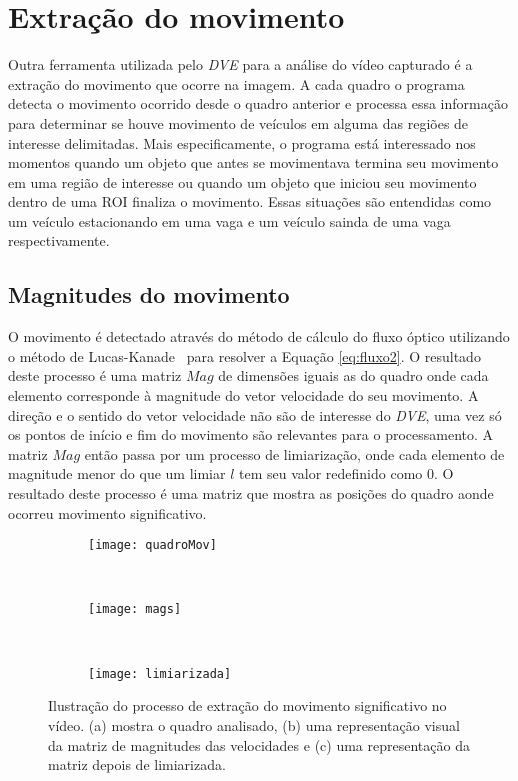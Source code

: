 \section{Extração do movimento}

Outra ferramenta utilizada pelo \textit{DVE} para a análise do vídeo capturado é a extração do movimento que ocorre na imagem. A cada quadro o programa detecta o movimento ocorrido desde o quadro anterior e processa essa informação para determinar se houve movimento de veículos em alguma das regiões de interesse delimitadas. Mais especificamente, o programa está interessado nos momentos quando um objeto que antes se movimentava termina seu movimento em uma região de interesse ou quando um objeto que iniciou seu movimento dentro de uma ROI finaliza o movimento. Essas situações são entendidas como um veículo estacionando em uma vaga e um veículo sainda de uma vaga respectivamente.

\subsection{Magnitudes do movimento}

O movimento é detectado através do método de cálculo do fluxo óptico utilizando o método de Lucas-Kanade~\cite{bruhn2005lucas,faria1992fluxo,mota2011tensor} para resolver a Equação \ref{eq:fluxo2}. O resultado deste processo é uma matriz $Mag$ de dimensões iguais as do quadro onde cada elemento corresponde à magnitude do vetor velocidade do seu movimento. A direção e o sentido do vetor velocidade não são de interesse do \textit{DVE}, uma vez só os pontos de início e fim do movimento são relevantes para o processamento. A matriz $Mag$ então passa por um processo de limiarização, onde cada elemento de magnitude menor do que um limiar $l$ tem seu valor redefinido como $0$. O resultado deste processo é uma matriz que mostra as posições do quadro aonde ocorreu movimento significativo. 



\begin{figure}
\centering
\begin{subfigure}{.5\textwidth}
  \centering
  \texttt{[image: quadroMov]}
  \caption{}
  \label{fig:ilustraMovimento:sub:quadro}
\end{subfigure}\\
\begin{subfigure}{.5\textwidth}
  \centering
  \texttt{[image: mags]}
  \caption{}
  \label{fig:ilustraMovimento:sub:mags}
\end{subfigure}\\
\begin{subfigure}{.5\textwidth}
  \centering
  \texttt{[image: limiarizada]}
  \caption{}
  \label{fig:ilustraMovimento:sub:limiarizada}
\end{subfigure}
\centering
\caption{Ilustração do processo de extração do movimento significativo no vídeo. (a) mostra o quadro analisado, (b) uma representação visual da matriz de magnitudes das velocidades e (c) uma representação da matriz depois de limiarizada.}
\label{fig:ilustraMovimento}
\end{figure}


